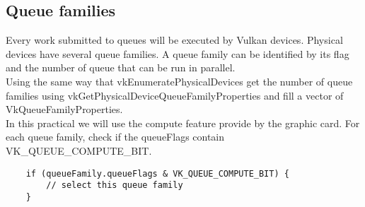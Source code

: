 \documentclass{article}
\begin{document}
\newpage
\subsection{Queue families}
Every work submitted to queues will be executed by Vulkan devices. Physical devices have several queue families. A queue family can be identified by its flag and the number of queue that can be run in parallel.\\
Using the same way that vkEnumeratePhysicalDevices get the number of queue families using vkGetPhysicalDeviceQueueFamilyProperties and fill a vector of VkQueueFamilyProperties.\\
In this practical we will use the compute feature provide by the graphic card. For each queue family, check if the queueFlags contain VK\_QUEUE\_COMPUTE\_BIT.
\begin{lstlisting}
	if (queueFamily.queueFlags & VK_QUEUE_COMPUTE_BIT) {
		// select this queue family
	}
\end{lstlisting}
\end{document}
